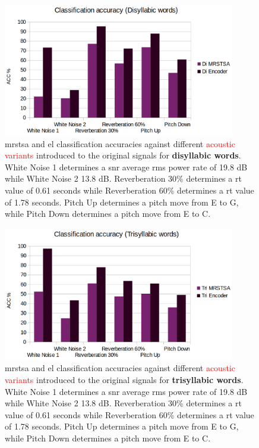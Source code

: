 \documentclass[10pt,letterpaper]{article}
\begin{document}
\begin{figure}[h!]
    \centering
    \includegraphics[width=0.9\textwidth]{DI_ACC.png}
    \caption{\gls{mrstsa} and \gls{el} classification accuracies against different \textcolor{red}{acoustic variants} introduced to the original signals
    for \textbf{disyllabic words}.
    White Noise 1 determines a \gls{snr} average \gls{rms} power rate of 19.8 dB while White Noise 2 13.8 dB.
    Reverberation 30\% determines a \gls{rt} value of 0.61 seconds while Reverberation 60\% determines a \gls{rt} value of 1.78 seconds.
    Pitch Up determines a pitch move from E to G, while Pitch Down determines a pitch move from E to C.}
    \label{fig:DI_ACC}
\end{figure}

\begin{figure}[h!]
    \centering
    \includegraphics[width=0.9\textwidth]{TRI_ACC.png}
    \caption{\gls{mrstsa} and \gls{el} classification accuracies against different \textcolor{red}{acoustic variants} introduced to the original signals
    for \textbf{trisyllabic words}.
    White Noise 1 determines a \gls{snr} average \gls{rms} power rate of 19.8 dB while White Noise 2 13.8 dB.
    Reverberation 30\% determines a \gls{rt} value of 0.61 seconds while Reverberation 60\% determines a \gls{rt} value of 1.78 seconds.
    Pitch Up determines a pitch move from E to G, while Pitch Down determines a pitch move from E to C.}
    \label{fig:TRI_ACC}
\end{figure}
\end{document}
